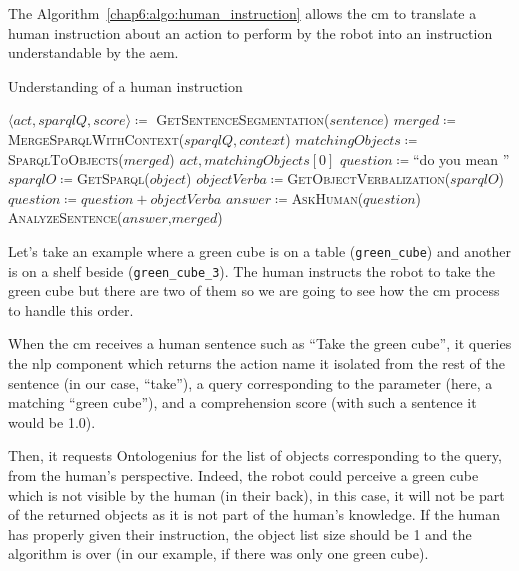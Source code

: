 \documentclass[a4paper,11pt,twoside]{StyleThese}
\begin{document}
The Algorithm~\ref{chap6:algo:human_instruction} allows the \acrshort{cm} to translate a human instruction about an action to perform by the robot into an instruction understandable by the \acrlong{aem}. 

\begin{algorithm}[!htb]
	\caption{Understanding of a human instruction}
	\label{chap6:algo:human_instruction}
	\begin{algorithmic}
		\State $\langle act, sparqlQ, score \rangle \coloneqq$ \textsc{GetSentenceSegmentation($sentence$)} 
		\State $merged \coloneqq$\textsc{MergeSparqlWithContext}($sparqlQ,context$)
		\State $matchingObjects \coloneqq$ \textsc{SparqlToObjects}($merged$)
		\State \Return $act,matchingObjects[0]$
		\Else
		\State $question \coloneqq$``do you mean ''
		\State $sparqlO \coloneqq$\textsc{GetSparql($object$)}
		\State $objectVerba \coloneqq$\textsc{GetObjectVerbalization($sparqlO$)}
		\State $question \coloneqq question + objectVerba$
		\EndFor
		\State $answer \coloneqq$\textsc{AskHuman}($question$)
		\State \textsc{AnalyzeSentence}($answer$,$merged$)
		\EndIf
		\EndIf
		\EndFunction
	\end{algorithmic}
\end{algorithm}		

Let's take an example where a green cube is on a table (\verb'green_cube') and another is on a shelf beside (\verb'green_cube_3'). The human instructs the robot to take the green cube but there are two of them so we are going to see how the \acrshort{cm} process to handle this order. 

When the \acrshort{cm} receives a human sentence such as ``Take the green cube'', it queries the \acrfull{nlp} component which returns the action name it isolated from the rest of the sentence (\eg in our case, ``take''), a \sparql{} query corresponding to the parameter (\eg here, a \sparql{} matching ``green cube''), and a comprehension score (\eg with such a sentence it would be 1.0). 

Then, it requests Ontologenius for the list of objects corresponding to the \sparql{} query, from the human's perspective. Indeed, the robot could perceive a green cube which is not visible by the human (\eg in their back), in this case, it will not be part of the returned objects as it is not part of the human's knowledge. If the human has properly given their instruction, the object list size should be 1 and the algorithm is over (\eg in our example, if there was only one green cube). 
\end{document}

